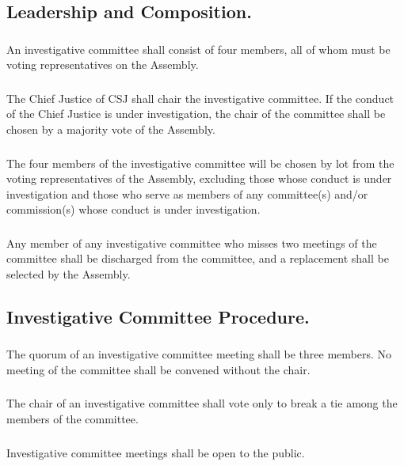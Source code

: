 \documentclass{rules}
\begin{document}
\subsection{Leadership and Composition.}
\subsubsection{}
An investigative committee shall consist of four members, all of whom must be voting representatives on the Assembly.  
\subsubsection{}
The Chief Justice of CSJ shall chair the investigative committee.  If the conduct of the Chief Justice is under investigation, the chair of the committee shall be chosen by a majority vote of the Assembly.
\subsubsection{}
The four members of the investigative committee will be chosen by lot from the voting representatives of the Assembly, excluding those whose conduct is under investigation and those who serve as members of any committee(s) and/or commission(s) whose conduct is under investigation.
\subsubsection{}
Any member of any investigative committee who misses two meetings of the committee shall be discharged from the committee, and a replacement shall be selected by the Assembly.
\subsection{Investigative Committee Procedure.}
\subsubsection{}
The quorum of an investigative committee meeting shall be three members.  No meeting of the committee shall be convened without the chair.
\subsubsection{}
The chair of an investigative committee shall vote only to break a tie among the members of the committee.
\subsubsection{}
Investigative committee meetings shall be open to the public.
\end{document}
